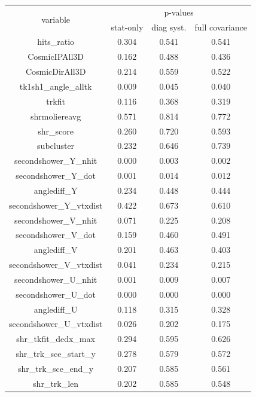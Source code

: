 \begin{table}[H]
\centering
\setlength{\tabcolsep}{10pt}
\renewcommand{\arraystretch}{1.25}
\begin{tabular}{| c | c | c | c | } 
 \hline
\multirow{2}{*}{variable} & \multicolumn{3}{c|}{p-values} \\
\cline{2-4} & stat-only & diag syst. & full covariance \\ \hline
hits\_ratio & 0.304 & 0.541 & 0.541 \\ \hline
CosmicIPAll3D & 0.162 & 0.488 & 0.436 \\ \hline
CosmicDirAll3D & 0.214 & 0.559 & 0.522 \\ \hline
tk1sh1\_angle\_alltk & 0.009 & 0.045 & 0.040 \\ \hline
trkfit & 0.116 & 0.368 & 0.319 \\ \hline
shrmoliereavg & 0.571 & 0.814 & 0.772 \\ \hline
shr\_score & 0.260 & 0.720 & 0.593 \\ \hline
subcluster & 0.232 & 0.646 & 0.739 \\ \hline
secondshower\_Y\_nhit & 0.000 & 0.003 & 0.002 \\ \hline
secondshower\_Y\_dot & 0.001 & 0.014 & 0.012 \\ \hline
anglediff\_Y & 0.234 & 0.448 & 0.444 \\ \hline
secondshower\_Y\_vtxdist & 0.422 & 0.673 & 0.610 \\ \hline
secondshower\_V\_nhit & 0.071 & 0.225 & 0.208 \\ \hline
secondshower\_V\_dot & 0.159 & 0.460 & 0.491 \\ \hline
anglediff\_V & 0.201 & 0.463 & 0.403 \\ \hline
secondshower\_V\_vtxdist & 0.041 & 0.234 & 0.215 \\ \hline
secondshower\_U\_nhit & 0.001 & 0.009 & 0.007 \\ \hline
secondshower\_U\_dot & 0.000 & 0.000 & 0.000 \\ \hline
anglediff\_U & 0.118 & 0.315 & 0.328 \\ \hline
secondshower\_U\_vtxdist & 0.026 & 0.202 & 0.175 \\ \hline
shr\_tkfit\_dedx\_max & 0.294 & 0.595 & 0.626 \\ \hline
shr\_trk\_sce\_start\_y & 0.278 & 0.579 & 0.572 \\ \hline
shr\_trk\_sce\_end\_y & 0.207 & 0.585 & 0.561 \\ \hline
shr\_trk\_len & 0.202 & 0.585 & 0.548 \\ \hline

\end{tabular}
\end{table}
